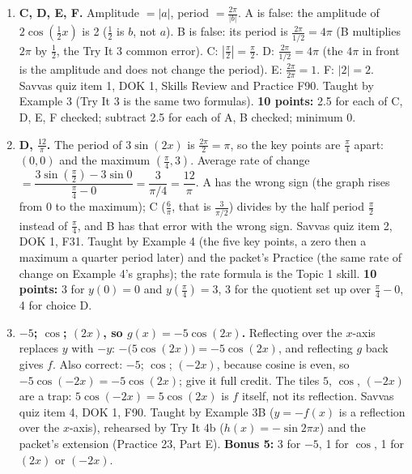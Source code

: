 \documentclass[11pt]{article}
\begin{document}
\raggedright
\begin{enumerate}
\item[\textbf{1.}] \textbf{C, D, E, F.} Amplitude $=|a|$, period $=\frac{2\pi}{|b|}$. A is false: the amplitude of $2\cos\left(\frac12x\right)$ is 2 ($\frac12$ is $b$, not $a$). B is false: its period is $\frac{2\pi}{1/2}=4\pi$ (B multiplies $2\pi$ by $\frac12$, the Try It 3 common error). C: $\left|\frac{\pi}{2}\right|=\frac{\pi}{2}$. D: $\frac{2\pi}{1/2}=4\pi$ (the $4\pi$ in front is the amplitude and does not change the period). E: $\frac{2\pi}{2\pi}=1$. F: $|2|=2$. Savvas quiz item 1, DOK 1, Skills Review and Practice F90. Taught by Example 3 (Try It 3 is the same two formulas). \textbf{10 points:} 2.5 for each of C, D, E, F checked; subtract 2.5 for each of A, B checked; minimum 0.
\item[\textbf{2.}] \textbf{D, $\frac{12}{\pi}$.} The period of $3\sin(2x)$ is $\frac{2\pi}{2}=\pi$, so the key points are $\frac{\pi}{4}$ apart: $(0,0)$ and the maximum $\left(\frac{\pi}{4},3\right)$. Average rate of change $=\dfrac{3\sin\left(\frac{\pi}{2}\right)-3\sin 0}{\frac{\pi}{4}-0}=\dfrac{3}{\pi/4}=\dfrac{12}{\pi}$. A has the wrong sign (the graph rises from 0 to the maximum); C ($\frac{6}{\pi}$, that is $\frac{3}{\pi/2}$) divides by the half period $\frac{\pi}{2}$ instead of $\frac{\pi}{4}$, and B has that error with the wrong sign. Savvas quiz item 2, DOK 1, F31. Taught by Example 4 (the five key points, a zero then a maximum a quarter period later) and the packet's Practice (the same rate of change on Example 4's graphs); the rate formula is the Topic 1 skill. \textbf{10 points:} 3 for $y(0)=0$ and $y\left(\frac{\pi}{4}\right)=3$, 3 for the quotient set up over $\frac{\pi}{4}-0$, 4 for choice D.
\item[\textbf{4.}] \textbf{$-5$; $\cos$; $(2x)$, so $g(x)=-5\cos(2x)$.} Reflecting over the $x$-axis replaces $y$ with $-y$: $-\bigl(5\cos(2x)\bigr)=-5\cos(2x)$, and reflecting $g$ back gives $f$. Also correct: $-5$; $\cos$; $(-2x)$, because cosine is even, so $-5\cos(-2x)=-5\cos(2x)$; give it full credit. The tiles $5$, $\cos$, $(-2x)$ are a trap: $5\cos(-2x)=5\cos(2x)$ is $f$ itself, not its reflection. Savvas quiz item 4, DOK 1, F90. Taught by Example 3B ($y=-f(x)$ is a reflection over the $x$-axis), rehearsed by Try It 4b ($h(x)=-\sin 2\pi x$) and the packet's extension (Practice 23, Part E). \textbf{Bonus 5:} 3 for $-5$, 1 for $\cos$, 1 for $(2x)$ or $(-2x)$.
\end{enumerate}
\end{document}
